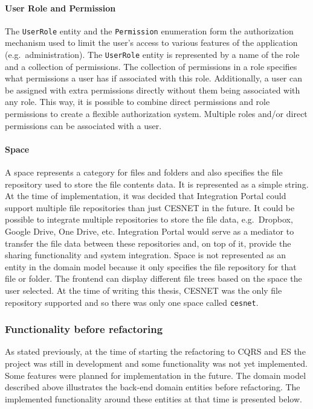 \documentclass{book}
\begin{document}
\paragraph{User Role and Permission}\label{user-role-and-permission}

The \texttt{UserRole} entity and the \texttt{Permission} enumeration
form the authorization mechanism used to limit the user's access to
various features of the application (e.g.~administration). The
\texttt{UserRole} entity is represented by a name of the role and a
collection of permissions. The collection of permissions in a role
specifies what permissions a user has if associated with this role.
Additionally, a user can be assigned with extra permissions directly
without them being associated with any role. This way, it is possible to
combine direct permissions and role permissions to create a flexible
authorization system. Multiple roles and/or direct permissions can be
associated with a user.

\paragraph{Space}\label{space}

A space represents a category for files and folders and also specifies
the file repository used to store the file contents data. It is
represented as a simple string. At the time of implementation, it was
decided that Integration Portal could support multiple file repositories
than just CESNET in the future. It could be possible to integrate
multiple repositories to store the file data, e.g.~Dropbox, Google
Drive, One Drive, etc. Integration Portal would serve as a mediator to
transfer the file data between these repositories and, on top of it,
provide the sharing functionality and system integration. Space is not
represented as an entity in the domain model because it only specifies
the file repository for that file or folder. The frontend can display
different file trees based on the space the user selected. At the time
of writing this thesis, CESNET was the only file repository supported
and so there was only one space called \texttt{cesnet}.


\subsubsection{Functionality before
refactoring}\label{functionality-before-refactoring}

As stated previously, at the time of starting the refactoring to CQRS
and ES the project was still in development and some functionality was
not yet implemented. Some features were planned for implementation in
the future. The domain model described above illustrates the back-end
domain entities before refactoring. The implemented functionality around
these entities at that time is presented below.
\end{document}
